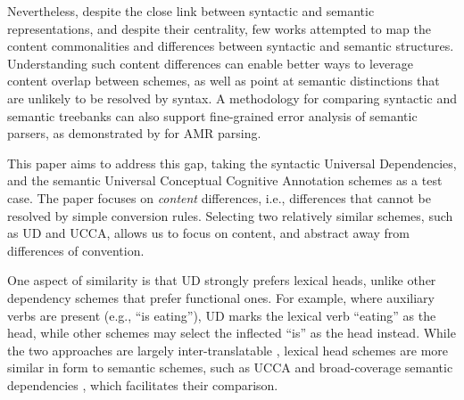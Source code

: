 \documentclass[11pt,a4paper]{article}
\begin{document}
  Nevertheless, despite the close link between syntactic and semantic representations,
  and despite their centrality, few works attempted to map the content commonalities and differences between syntactic and semantic structures.
  Understanding such content differences can enable better ways to leverage content overlap between schemes, as well as point at semantic distinctions that are unlikely to be resolved by syntax.
   A methodology for comparing syntactic and semantic treebanks can also support fine-grained error analysis of semantic parsers, as demonstrated by \citet{szubert2018structured} for AMR \cite{banarescu2013abstract}
   parsing.
   
   This paper aims to address this gap, taking the syntactic Universal Dependencies,
  and the semantic Universal Conceptual Cognitive Annotation \cite[UCCA; ][]{abend2013universal} schemes as a test case. 
  The paper focuses on {\it content} differences, i.e., differences that cannot be resolved by simple
  conversion rules. Selecting two relatively similar schemes, such as UD and UCCA, allows
  us to focus on content, and abstract away from differences of convention.
  
  One aspect of similarity is that UD strongly prefers lexical heads,
   unlike other dependency schemes that prefer functional ones.
   For example, where auxiliary verbs are present (e.g., ``is eating''), UD
   marks the lexical verb ``eating'' as the head, while other schemes
   may select the inflected ``is'' as the head instead.
  While the two approaches are largely inter-translatable
   \cite{Schwartz:12}, lexical head schemes are more similar in form to semantic schemes,
   such as UCCA and broad-coverage semantic dependencies \cite{oepen2015semeval},
   which facilitates their comparison.


  
\end{document}
